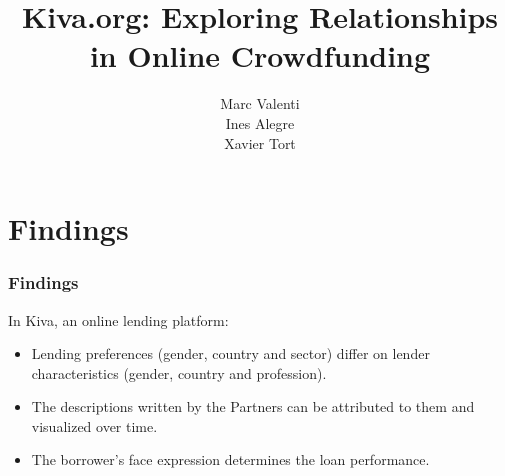 \documentclass{beamer}
\begin{document}
\title{Kiva.org: Exploring Relationships in Online Crowdfunding}
\author{Marc Valenti \\ Ines Alegre \\ Xavier Tort}


\begin{frame}
\titlepage
\end{frame}

\section{Findings} 
\begin{frame}\frametitle{Findings}
In Kiva, an online lending platform:
\begin{itemize}
\item Lending preferences (gender, country and sector) differ on lender characteristics (gender, country and profession).
\item The descriptions written by the Partners can be attributed to them and visualized over time.
\item The borrower's face expression determines the loan performance.
\end{itemize}
\end{frame}



\end{document}
